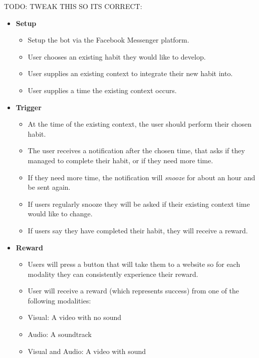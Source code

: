 TODO: TWEAK THIS SO ITS CORRECT:
\begin{itemize}
  \item \textbf{Setup}
  \begin{itemize}
    \item Setup the bot via the Facebook Messenger platform.
    \item User chooses an existing habit they would like to develop.
    \item User supplies an existing context to integrate their new habit into.
    \item User supplies a time the existing context occurs.
  \end{itemize}
  \item \textbf{Trigger}
  \begin{itemize}
    \item At the time of the existing context, the user should perform their chosen habit.
    \item The user receives a notification after the chosen time, that asks if they managed to complete their habit, or if they need more time.
    \item If they need more time, the notification will \textit{snooze} for about an hour and be sent again.
    \item If users regularly snooze they will be asked if their existing context time would like to change.
    \item If users say they have completed their habit, they will receive a reward.
  \end{itemize}
  \item \textbf{Reward}
  \begin{itemize}
    \item Users will press a button that will take them to a website so for each modality they can consistently experience their reward.
    \item User will receive a reward (which represents success) from one of the following modalities:
    \item Visual: A video with no sound
    \item Audio: A soundtrack
    \item Visual and Audio: A video with sound
  \end{itemize}
\end{itemize}


